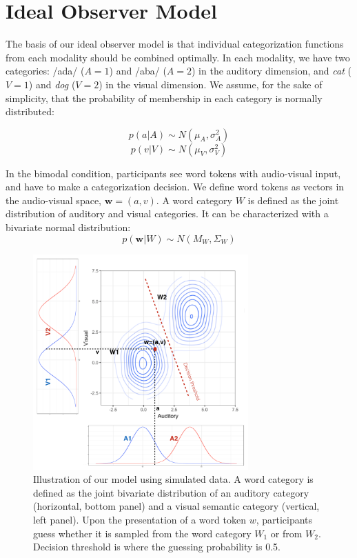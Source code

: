 \documentclass[10pt,letterpaper]{article}
\begin{document}
\section{Ideal Observer Model}

The basis of our ideal observer model is that individual categorization functions from each modality should be combined optimally.
In each modality, we have two categories: /ada/ ($A=1$) and /aba/ ($A=2$) in the auditory dimension, and \textit{cat} ($V=1$) and \textit{dog} ($V=2$) in the visual dimension.
We assume, for the sake of simplicity, that the probability of membership in each category is normally distributed:

$$ p(a | A) \sim  N(\mu_A, \sigma^2_A) $$
$$ p(v | V) \sim  N(\mu_V, \sigma^2_V) $$

In the bimodal condition, participants see word tokens with audio-visual input, and have to make a categorization decision. We define word tokens as vectors in the audio-visual space, $\mathbf{w}=(a,v)$.
A word category $W$ is defined as the joint distribution of auditory and visual categories. It can be characterized with a bivariate normal distribution:
$$ p(\mathbf{w} | W) \sim  N(M_W, \Sigma_W) $$

\begin{figure}[tp]
  \centering
  \includegraphics[width=3.25in]{pictures/model.png}
  \caption{Illustration of our model using simulated data. A word category is defined as the joint bivariate distribution of an auditory category (horizontal, bottom panel) and a visual semantic category (vertical, left panel). Upon the presentation of a word token $w$, participants guess whether it is sampled from the word category $W_1$ or from $W_2$. Decision threshold is where the guessing probability is 0.5.}
  \label{fig:space}
\end{figure}
\end{document}
